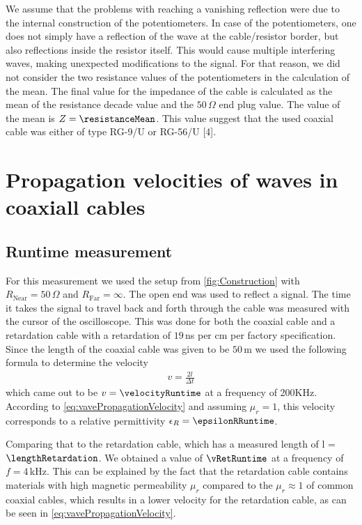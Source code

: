 \documentclass[a4paper,10pt,twocolumn]{article}
\begin{document}
    We assume that the problems with reaching a vanishing reflection were due to the internal construction of the potentiometers.
    In case of the potentiometers, one does not simply have a reflection of the wave at the cable/resistor border, but also reflections inside the resistor itself.
    This would cause multiple interfering waves, making unexpected modifications to the signal.
    For that reason, we did not consider the two resistance values of the potentiometers in the calculation of the mean.
    The final value for the impedance of the cable is calculated as the mean of the resistance decade value and the $50\,\Omega$ end plug value.
    The value of the mean is $Z = \resistanceMean$.
    This value suggest that the used coaxial cable was either of type RG-9/U or RG-56/U [4].
    \section{Propagation velocities of waves in coaxiall cables}
    \subsection{Runtime measurement}
    \label{subsec:runtimeMeasurement}
    For this measurement we used the setup from \autoref{fig:Construction} with $R_{\text{Near}}=50\,\Omega$ and $R_{\text{Far}}=\infty$.
    The open end was used to reflect a signal.
    The time it takes the signal to travel back and forth through the cable was measured with the cursor of the oscilloscope.
    This was done for both the coaxial cable and a retardation cable with a retardation of $19\,$ns per cm per factory specification.
    Since the length of the coaxial cable was given to be $50\,$m we used the following formula to determine the velocity
    \begin{align}
        \label{eq:runtimeVelocity}
        v=\frac{2l}{\Delta t}
        \end{align}
    which came out to be $v = \velocityRuntime$ at a frequency of 200KHz.
    According to \autoref{eq:vavePropagationVelocity} and assuming $\mu_r = 1$, this velocity corresponds to a relative permittivity $\epsilon_R = \epsilonRRuntime$.
    
    Comparing that to the retardation cable, which has a measured length of l = $\lengthRetardation$.
    We obtained a value of $\vRetRuntime$ at a frequency of $f = 4\,$kHz.
    This can be explained by the fact that the retardation cable contains materials with high magnetic permeability $\mu_r$ compared to the $\mu_r \approx 1 $ of
    common coaxial cables, which results in a lower velocity for the retardation cable, as can be seen in \autoref{eq:vavePropagationVelocity}.
\end{document}
